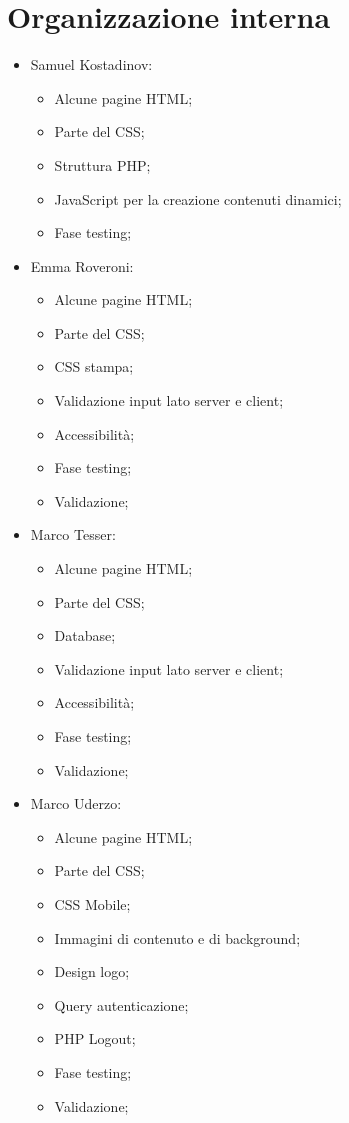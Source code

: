 \section{Organizzazione interna}

\begin{itemize}
	\item Samuel Kostadinov:
	\begin{itemize}
		\item Alcune pagine HTML;
		\item Parte del CSS;
		\item Struttura PHP;
		\item JavaScript per la creazione contenuti dinamici;
		\item Fase testing; 
	\end{itemize}
	\item Emma Roveroni:
	\begin{itemize}
		\item Alcune pagine HTML;
		\item Parte del CSS;
		\item CSS stampa;
		\item Validazione input lato server e client; 
		\item Accessibilità;
		\item Fase testing;
		\item Validazione;
	\end{itemize}
	\item Marco Tesser:
	\begin{itemize}
		\item Alcune pagine HTML;
		\item Parte del CSS;
		\item Database;
		\item Validazione input lato server e client;
		\item Accessibilità;
		\item Fase testing;
		\item Validazione;
	\end{itemize}
	\item Marco Uderzo:
	\begin{itemize}
		\item Alcune pagine HTML;
		\item Parte del CSS;
		\item CSS Mobile;
		\item Immagini di contenuto e di background;
		\item Design logo;
		\item Query autenticazione;
		\item PHP Logout;
		\item Fase testing;
		\item Validazione;
	\end{itemize}
\end{itemize} 